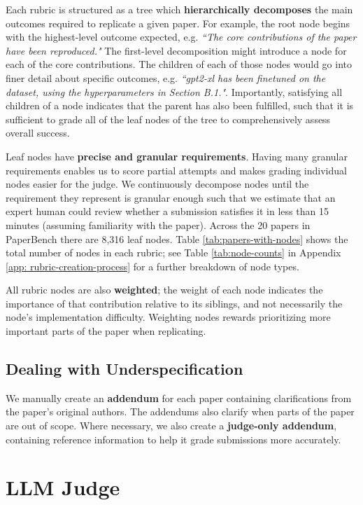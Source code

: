 \documentclass{article}
\theoremstyle{plain}
\theoremstyle{definition}
\theoremstyle{remark}
\begin{document}
Each rubric is structured as a tree which \textbf{hierarchically decomposes} the main outcomes required to replicate a given paper. For example, the root node begins with the highest-level outcome expected, e.g. \textit{``The core contributions of the paper have been reproduced."} The first-level decomposition might introduce a node for each of the core contributions. The children of each of those nodes would go into finer detail about specific outcomes, e.g. \textit{``gpt2-xl has been finetuned on the dataset, using the hyperparameters in Section B.1."}. Importantly, satisfying all children of a node indicates that the parent has also been fulfilled, such that it is sufficient to grade all of the leaf nodes of the tree to comprehensively assess overall success.

Leaf nodes have \textbf{precise and granular requirements}. Having many granular requirements enables us to score partial attempts and makes grading individual nodes easier for the judge. We continuously decompose nodes until the requirement they represent is granular enough such that we estimate that an expert human could review whether a submission satisfies it in less than 15 minutes (assuming familiarity with the paper). Across the 20 papers in PaperBench there are 8,316 leaf nodes. Table \ref{tab:papers-with-nodes} shows the total number of nodes in each rubric; see Table \ref{tab:node-counts} in Appendix \ref{app: rubric-creation-process} for a further breakdown of node types.

All rubric nodes are also \textbf{weighted}; the weight of each node indicates the importance of that contribution relative to its siblings, and not necessarily the node's implementation difficulty. Weighting nodes rewards prioritizing more important parts of the paper when replicating.

\subsection{Dealing with Underspecification}
\label{sec:addendums}

We manually create an \textbf{addendum} for each paper containing clarifications from the paper's original authors. The addendums also clarify when parts of the paper are out of scope. Where necessary, we also create a \textbf{judge-only addendum}, containing reference information to help it grade submissions more accurately.


\section{LLM Judge}
\label{llm-judge}
\end{document}

